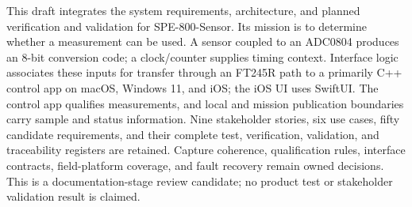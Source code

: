 This draft integrates the system requirements, architecture, and planned verification and validation for SPE-800-Sensor. Its mission is to determine whether a measurement can be used. A sensor coupled to an ADC0804 produces an 8-bit conversion code; a clock/counter supplies timing context. Interface logic associates these inputs for transfer through an FT245R path to a primarily C++ control app on macOS, Windows 11, and iOS; the iOS UI uses SwiftUI. The control app qualifies measurements, and local and mission publication boundaries carry sample and status information. Nine stakeholder stories, six use cases, fifty candidate requirements, and their complete test, verification, validation, and traceability registers are retained. Capture coherence, qualification rules, interface contracts, field-platform coverage, and fault recovery remain owned decisions. This is a documentation-stage review candidate; no product test or stakeholder validation result is claimed.
